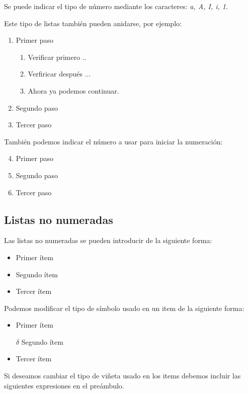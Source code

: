 \documentclass[letterpaper,11pt]{article}
\begin{document}
Se puede indicar el tipo de número mediante los caracteres: \textit{a, A, I, i, 1}.

Este tipo de listas también pueden anidarse, por ejemplo:

\begin{enumerate}
	\item Primer paso
		\begin{enumerate}
			\item Verificar primero ..
			\item Verfiricar después ...
			\item Ahora ya podemos continuar.
		\end{enumerate}
	\item Segundo paso
	\item Tercer paso
\end{enumerate}

También podemos indicar el número a usar para iniciar la numeración:

\begin{enumerate}
	\setcounter{enumi}{3}
	\item Primer paso
	\item Segundo paso
	\item Tercer paso
\end{enumerate}

\subsection{Listas no numeradas}

Las listas no numeradas se pueden introducir de la siguiente forma: 

\begin{itemize}
	\item Primer ítem
	\item Segundo ítem
	\item Tercer ítem
\end{itemize}

Podemos modificar el tipo de símbolo usado en un item de la siguiente forma:

\begin{itemize}
	\item Primer ítem
	\item[$\delta$] Segundo ítem
	\item Tercer ítem
\end{itemize}

Si deseamos cambiar el tipo de viñeta usado en los items debemos incluir las siguientes expresiones en el preámbulo.
\end{document}
